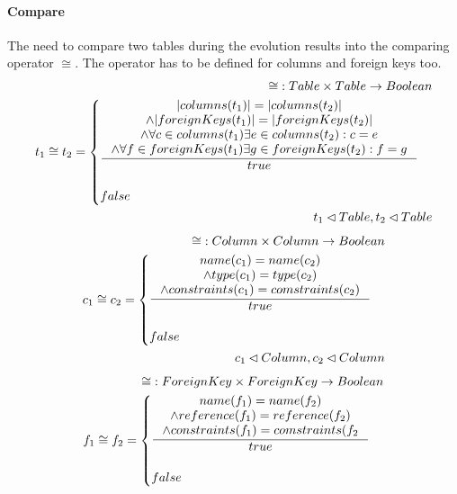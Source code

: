 \documentclass[11pt]{article}
\begin{document}
\paragraph{Compare} The need to compare two tables during the evolution results into the comparing operator $\cong$. The operator has to be defined for columns and foreign keys too.
\begin{align*}
	\mathbf{\cong} : Table \times Table \rightarrow Boolean \\
	t_1 \cong t_2 = \begin{cases}
 		\inference{|columns(t_1)| = |columns(t_2)| \\ \wedge |foreignKeys(t_1)| = |foreignKeys(t_2)| \\ \wedge \forall c \in columns(t_1) \exists e \in columns(t_2) : c = e \\ \wedge \forall f \in foreignKeys(t_1) \exists g \in foreignKeys(t_2) : f = g }{true}\\\\
 false
 \end{cases}\\
 t_1 \lhd Table, t_2 \lhd Table
\end{align*}
\begin{align*}
	\mathbf{\cong} : Column \times Column \rightarrow Boolean \\
	c_1 \cong c_2 = \begin{cases}
 		\inference{name(c_1) = name(c_2) \\ \wedge type(c_1) = type(c_2) \\ \wedge constraints(c_1) = comstraints(c_2)}{true}
 		\\ \\
		false
 \end{cases}\\
 c_1 \lhd Column, c_2 \lhd Column
\end{align*}
\begin{align*}
	\mathbf{\cong} : ForeignKey \times ForeignKey \rightarrow Boolean \\
	f_1 \cong f_2 = \begin{cases}
 		\inference{name(f_1) = name(f_2) \\ \wedge reference(f_1) = reference(f_2) \\ \wedge constraints(f_1) = comstraints(f_2}{true}
 		\\ \\
		false
 \end{cases}
\end{align*}
\end{document}

